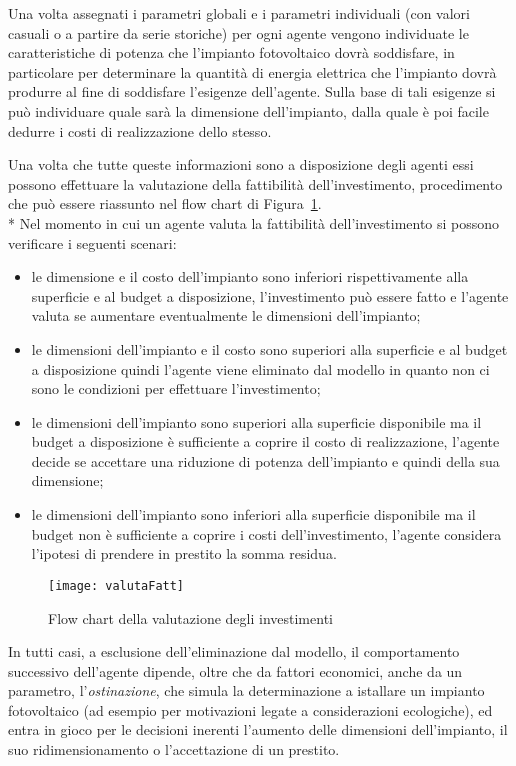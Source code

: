 Una volta assegnati i parametri globali e i parametri individuali (con valori casuali o a partire da serie storiche) per ogni agente vengono individuate le caratteristiche di potenza che l'impianto fotovoltaico dovrà soddisfare, in particolare per determinare la quantità di energia elettrica che l'impianto dovrà produrre al fine di soddisfare l'esigenze dell'agente. Sulla base di tali esigenze si può individuare quale sarà la dimensione dell'impianto, dalla quale è poi facile dedurre i costi di realizzazione dello stesso.

Una volta che tutte queste informazioni sono a disposizione degli agenti essi possono effettuare la valutazione della fattibilità dell'investimento, procedimento che può essere riassunto nel flow chart di Figura~\ref{flowChartValFatt}.
\\*
Nel  momento in cui un agente valuta la fattibilità dell'investimento si possono verificare i seguenti scenari:
\begin{itemize}
\item le dimensione e il costo dell'impianto sono inferiori rispettivamente  alla superficie e al budget a disposizione, l'investimento può essere fatto e l'agente valuta se aumentare eventualmente le dimensioni dell'impianto;
\item le dimensioni dell'impianto e il costo sono superiori alla superficie e al budget a disposizione quindi l'agente viene eliminato dal modello in quanto non ci sono le condizioni per effettuare l'investimento;
\item le dimensioni dell'impianto sono superiori alla superficie disponibile ma il budget a disposizione è sufficiente a coprire il costo di realizzazione, l'agente decide se accettare una riduzione di potenza dell'impianto e quindi della sua dimensione;
\item le dimensioni dell'impianto sono inferiori alla superficie disponibile ma il budget non è sufficiente a coprire i costi dell'investimento, l'agente considera l'ipotesi di prendere in prestito la somma residua.
\end{itemize}

\begin{figure}[hbt]
	\centering
	\texttt{[image: valutaFatt]}
	\caption{Flow chart della valutazione degli investimenti}
	\label{flowChartValFatt}
\end{figure}

In tutti casi, a esclusione dell'eliminazione dal modello, il comportamento successivo dell'agente dipende, oltre che da fattori economici, anche da un parametro, l'\emph{ostinazione}, che simula la determinazione a istallare un impianto fotovoltaico (ad esempio per motivazioni legate a considerazioni ecologiche), ed entra in gioco per le decisioni inerenti l'aumento delle dimensioni dell'impianto, il suo ridimensionamento o l'accettazione di un prestito.

